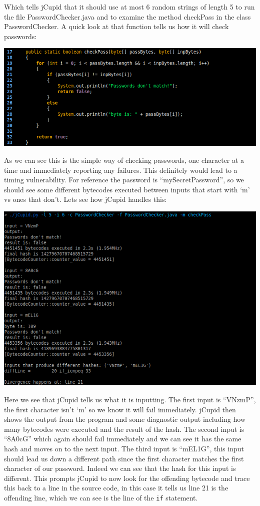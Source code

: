 Which tells jCupid that it should use at most 6 random strings of length 5 to run the file PasswordChecker.java
and to examine the method checkPass in the class PasswordChecker. A quick look at that function tells us how
it will check passwords:

\begin{center}
  \includegraphics[width=\linewidth]{PasswordChecker}
\end{center}

As we can see this is the simple way of checking passwords, one character at a time and immediately reporting
any failures. This definitely would lead to a timing vulnerability. For reference the password is 
``mySecretPassword'', so we should see some different bytecodes executed between inputs that start with `m'
vs ones that don't. Lets see how jCupid handles this:

\begin{center}
  \includegraphics[width=\linewidth]{jCupidRun1}
\end{center}

Here we see that jCupid tells us what it is inputting. The first input is ``VNzmP'', the first character
isn't `m' so we know it will fail immediately. jCupid then shows the output from the program and some
diagnostic output including how many bytecodes were executed and the result of the hash. The second input
is ``8A0cG'' which again should fail immediately and we can see it has the same hash and moves on to the
next input. The third input is ``mEL1G'', this input should lead us down a different path since the first
character matches the first character of our password. Indeed we can see that the hash for this input is
different. This prompts jCupid to now look for the offending bytecode and trace this back to a line in 
the source code, in this case it tells us line 21 is the offending line, which we can see is the line of
the \texttt{if} statement.

